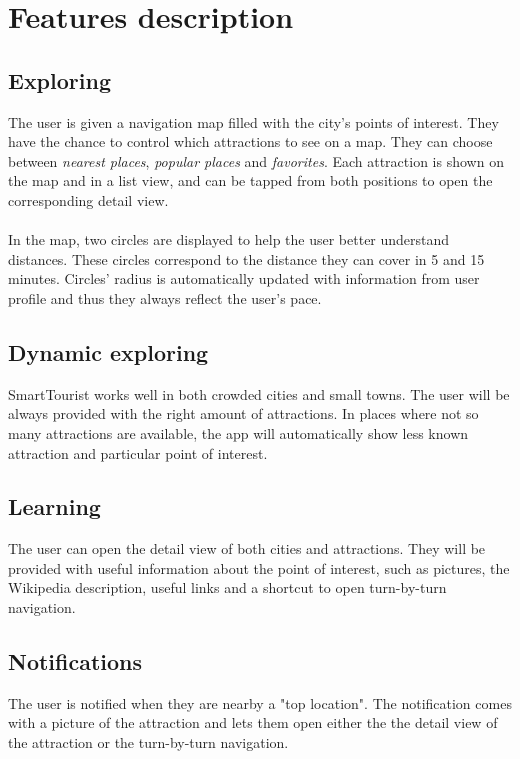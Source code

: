 \documentclass[a4paper, 11pt, parskip=half]{scrreprt}
\theoremstyle{definition}
\begin{document}
\section{Features description}

\subsection{Exploring}
The user is given a navigation map filled with the city's points of interest. They have the chance to control which attractions to see on a map. They can choose between \textit{nearest places}, \textit{popular places} and \textit{favorites}. Each attraction is shown on the map and in a list view, and can be tapped from both positions to open the corresponding detail view.
\\\\In the map, two circles are displayed to help the user better understand distances. These circles correspond to the distance they can cover in 5 and 15 minutes. Circles' radius is automatically updated with information from user profile and thus they always reflect the user's pace.

\subsection{Dynamic exploring}
SmartTourist works well in both crowded cities and small towns. The user will be always provided with the right amount of attractions. In places where not so many attractions are available, the app will automatically show less known attraction and particular point of interest.

\subsection{Learning}
The user can open the detail view of both cities and attractions. They will be provided with useful information about the point of interest, such as pictures, the Wikipedia description, useful links and a shortcut to open turn-by-turn navigation.

\subsection{Notifications}
The user is notified when they are nearby a "top location". The notification comes with a picture of the attraction and lets them open either the the detail view of the attraction or the turn-by-turn navigation. 
\end{document}
